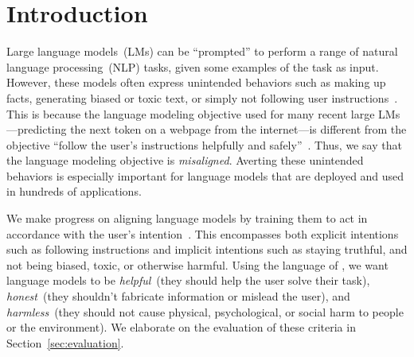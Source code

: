 \documentclass{article}
\begin{document}
\section{Introduction}
\label{sec:intro}

Large language models~(LMs) can be ``prompted'' to perform a range of natural language processing~(NLP) tasks, given some examples of the task as input. However, these models often express unintended behaviors such as making up facts, generating biased or toxic text, or simply not following user instructions~\citep{bender2021dangers,bommasani2021opportunities,kenton2021alignment,weidinger2021ethical,tamkin2021understanding,gehman2020realtoxicityprompts}. This is because the language modeling objective used for many recent large LMs---predicting the next token on a webpage from the internet---is different from the objective ``follow the user's instructions helpfully and safely''~\citep{radford2019language,brown2020language,fedus2021switch,rae2021scaling,thoppilan2022lamda}. Thus, we say that the language modeling objective is \textit{misaligned}. Averting these unintended behaviors is especially important for language models that are deployed and used in hundreds of applications.

We make progress on aligning language models by training them to act in accordance with the user's intention~\citep{leike2018scalable}. This encompasses both explicit intentions such as following instructions and implicit intentions such as staying truthful, and not being biased, toxic, or otherwise harmful. Using the language of \citet{askell2021general}, we want language models to be \textit{helpful}~(they should help the user solve their task), \textit{honest}~(they shouldn't fabricate information or mislead the user), and \textit{harmless}~(they should not cause physical, psychological, or social harm to people or the environment). We elaborate on the evaluation of these criteria in Section~\ref{sec:evaluation}.
\end{document}

